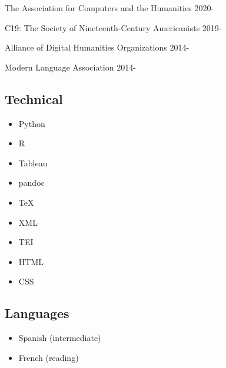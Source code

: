 \documentclass[
  12pt,
  letterpaper,
]{article}
\providecommand{\tightlist}{%
  \setlength{\itemsep}{0pt}\setlength{\parskip}{0pt}}
\begin{document}
The Association for Computers and the Humanities \hfill 2020-

C19: The Society of Nineteenth-Century Americanists \hfill 2019-

Alliance of Digital Humanities Organizations \hfill 2014-

Modern Language Association \hfill 2014-

\hypertarget{technical}{%
\subsection{Technical}\label{technical}}

\begin{itemize}
\tightlist
\item
  Python
\item
  R
\item
  Tableau
\item
  pandoc
\item
  TeX
\item
  XML
\item
  TEI
\item
  HTML
\item
  CSS
\end{itemize}

\hypertarget{languages}{%
\subsection{Languages}\label{languages}}

\begin{itemize}
\tightlist
\item
Spanish (intermediate)
\item
French (reading)
\end{itemize}
\end{document}
